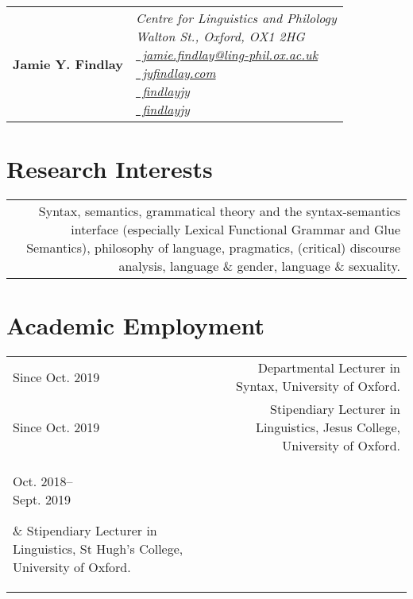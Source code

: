 \documentclass[11pt,a4paper]{article}
\makeatletter
\newcommand{\name}{Jamie Y. Findlay}
\newcommand{\datewidth}{0.15}
\newenvironment{cvsection}{%
  \setlength{\extrarowheight}{0.70ex}
  \begin{longtable}[l]{@{} L R @{}}
}{%
  \end{longtable}
}
\newcommand{\icon}[1]{\raisebox{-.2\dp\strutbox}{#1}} %
\newcommand{\longdate}[1]{\parbox[t]{\datewidth\textwidth}{\raggedleft
#1}}
\newcommand{\ContactInfo}[1]{%
\parbox[c]{\hsize}{\raggedleft\footnotesize\it%
#1}%
}
\makeatother
\begin{document}
\thispagestyle{first}

\begin{tabularx}{\linewidth}{@{}lX@{}}
{\Huge\textbf{\name}}%
&\ContactInfo{%
Centre for Linguistics and Philology\\
Walton St., Oxford, OX1 2HG\\
 \href{mailto:jamie.findlay@ling-phil.ox.ac.uk}{{\icon{\faEnvelopeO}\ jamie.findlay@ling-phil.ox.ac.uk}}\\
 \href{http://jyfindlay.com}{\icon{\faChain}\ jyfindlay.com}\\
 \href{http://www.linkedin.com/in/findlayjy}{\icon{\faLinkedinSquare}\ findlayjy}\\
 \href{https://github.com/findlayjy}{\icon{\faGithub}\ findlayjy}
}
\end{tabularx}


\section*{Research Interests}

\begin{cvsection}
    &
     Syntax, semantics, grammatical theory and the syntax-semantics interface (especially Lexical Functional Grammar and Glue Semantics), philosophy of language, pragmatics, (critical) discourse analysis, language \& gender, language \& sexuality.
\end{cvsection}


\section*{Academic Employment}

\begin{cvsection}
  Since Oct. 2019 & Departmental Lecturer in Syntax, University of Oxford.\\
  Since Oct. 2019 & Stipendiary Lecturer in Linguistics, Jesus College, University of Oxford.\\
  \longdate{Oct. 2018--\\[-0.5em] Sept. 2019} & Stipendiary Lecturer in Linguistics, St Hugh's College, University of Oxford.\\
\end{cvsection}
\end{document}
